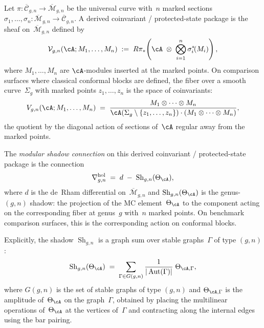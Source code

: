 Let $\pi \colon \overline{\mathcal{C}}_{g,n} \to \overline{\mathcal{M}}_{g,n}$
be the universal curve with~$n$ marked sections
$\sigma_1, \ldots, \sigma_n \colon \overline{\mathcal{M}}_{g,n}
\to \overline{\mathcal{C}}_{g,n}$. A derived coinvariant /
protected-state package is the sheaf on~$\overline{\mathcal{M}}_{g,n}$
defined by
\begin{equation}\label{eq:thqg-intro-conformal-block-bundle}
\mathcal{V}_{g,n}(\cA; M_1, \ldots, M_n)
\;:=\;
R\pi_*\!\left(
 \cA \;\otimes\;
 \bigotimes_{i=1}^n \sigma_i^*\!(M_i)
\right),
\end{equation}
where $M_1, \ldots, M_n$ are $\cA$-modules inserted at the marked
points. On comparison surfaces where classical conformal blocks are
defined, the fiber over a smooth curve~$\Sigma_g$ with marked points
$z_1, \ldots, z_n$ is the space of coinvariants:
\[
V_{g,n}(\cA; M_1, \ldots, M_n)
\;=\;
\frac{M_1 \otimes \cdots \otimes M_n}{
 \cA(\Sigma_g \setminus \{z_1, \ldots, z_n\})
 \cdot (M_1 \otimes \cdots \otimes M_n)
},
\]
the quotient by the diagonal action of sections of~$\cA$ regular
away from the marked points.

\begin{definition}
\label{def:thqg-intro-shadow-connection}
The \emph{modular shadow connection} on this derived coinvariant /
protected-state package is the connection
\begin{equation}\label{eq:thqg-intro-shadow-connection-formula}
\nabla^{\mathrm{hol}}_{g,n}
\;=\;
d \;-\; \operatorname{Sh}_{g,n}(\Theta_\cA),
\end{equation}
where $d$ is the de~Rham differential on~$\overline{\mathcal{M}}_{g,n}$
and $\operatorname{Sh}_{g,n}(\Theta_\cA)$ is the genus-$(g,n)$
shadow: the projection of the MC element~$\Theta_\cA$ to the
component acting on the corresponding fiber at genus~$g$
with~$n$ marked points. On benchmark comparison surfaces, this is
the corresponding action on conformal blocks.

Explicitly, the shadow $\operatorname{Sh}_{g,n}$ is a graph sum over
stable graphs~$\Gamma$ of type $(g,n)$:
\begin{equation}\label{eq:thqg-intro-shadow-graph-sum}
\operatorname{Sh}_{g,n}(\Theta_\cA)
\;=\;
\sum_{\Gamma \in G(g,n)}
\frac{1}{|\operatorname{Aut}(\Gamma)|}
\;\Theta_{\cA,\Gamma},
\end{equation}
where $G(g,n)$ is the set of stable graphs of type $(g,n)$ and
$\Theta_{\cA,\Gamma}$ is the amplitude of~$\Theta_\cA$ on the
graph~$\Gamma$, obtained by placing the multilinear operations
of~$\Theta_\cA$ at the vertices of~$\Gamma$ and contracting along
the internal edges using the bar pairing.
\end{definition}

